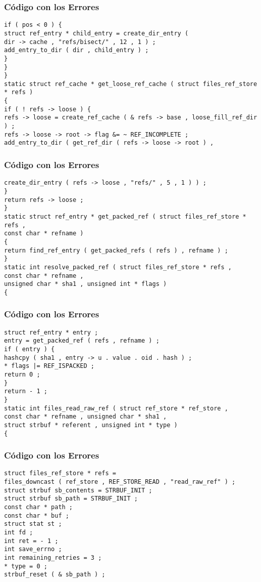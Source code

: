 \documentclass{beamer}
\begin{document}
\begin{frame}[fragile]
\frametitle{C\'odigo con los Errores}
\begin{verbatim}
if ( pos < 0 ) { 
struct ref_entry * child_entry = create_dir_entry ( 
dir -> cache , "refs/bisect/" , 12 , 1 ) ; 
add_entry_to_dir ( dir , child_entry ) ; 
} 
} 
} 
static struct ref_cache * get_loose_ref_cache ( struct files_ref_store * refs ) 
{ 
if ( ! refs -> loose ) { 
refs -> loose = create_ref_cache ( & refs -> base , loose_fill_ref_dir ) ; 
refs -> loose -> root -> flag &= ~ REF_INCOMPLETE ; 
add_entry_to_dir ( get_ref_dir ( refs -> loose -> root ) , 
\end{verbatim}
\end{frame}
\begin{frame}[fragile]
\frametitle{C\'odigo con los Errores}
\begin{verbatim}
create_dir_entry ( refs -> loose , "refs/" , 5 , 1 ) ) ; 
} 
return refs -> loose ; 
} 
static struct ref_entry * get_packed_ref ( struct files_ref_store * refs , 
const char * refname ) 
{ 
return find_ref_entry ( get_packed_refs ( refs ) , refname ) ; 
} 
static int resolve_packed_ref ( struct files_ref_store * refs , 
const char * refname , 
unsigned char * sha1 , unsigned int * flags ) 
{ 
\end{verbatim}
\end{frame}
\begin{frame}[fragile]
\frametitle{C\'odigo con los Errores}
\begin{verbatim}
struct ref_entry * entry ; 
entry = get_packed_ref ( refs , refname ) ; 
if ( entry ) { 
hashcpy ( sha1 , entry -> u . value . oid . hash ) ; 
* flags |= REF_ISPACKED ; 
return 0 ; 
} 
return - 1 ; 
} 
static int files_read_raw_ref ( struct ref_store * ref_store , 
const char * refname , unsigned char * sha1 , 
struct strbuf * referent , unsigned int * type ) 
{ 
\end{verbatim}
\end{frame}
\begin{frame}[fragile]
\frametitle{C\'odigo con los Errores}
\begin{verbatim}
struct files_ref_store * refs = 
files_downcast ( ref_store , REF_STORE_READ , "read_raw_ref" ) ; 
struct strbuf sb_contents = STRBUF_INIT ; 
struct strbuf sb_path = STRBUF_INIT ; 
const char * path ; 
const char * buf ; 
struct stat st ; 
int fd ; 
int ret = - 1 ; 
int save_errno ; 
int remaining_retries = 3 ; 
* type = 0 ; 
strbuf_reset ( & sb_path ) ; 
\end{verbatim}
\end{frame}
\end{document}
